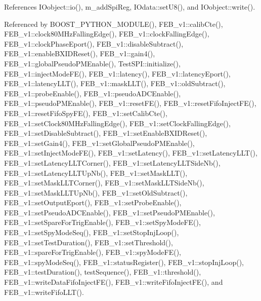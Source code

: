 References I\+Oobject\+::io(), m\+\_\+add\+Spi\+Reg, I\+Odata\+::set\+U8(), and I\+Oobject\+::write().



Referenced by B\+O\+O\+S\+T\+\_\+\+P\+Y\+T\+H\+O\+N\+\_\+\+M\+O\+D\+U\+L\+E(), F\+E\+B\+\_\+v1\+::calib\+Cte(), F\+E\+B\+\_\+v1\+::clock80\+M\+Hz\+Falling\+Edge(), F\+E\+B\+\_\+v1\+::clock\+Falling\+Edge(), F\+E\+B\+\_\+v1\+::clock\+Phase\+Eport(), F\+E\+B\+\_\+v1\+::disable\+Subtract(), F\+E\+B\+\_\+v1\+::enable\+B\+X\+I\+D\+Reset(), F\+E\+B\+\_\+v1\+::gain4(), F\+E\+B\+\_\+v1\+::global\+Pseudo\+P\+M\+Enable(), Test\+S\+P\+I\+::initialize(), F\+E\+B\+\_\+v1\+::inject\+Mode\+F\+E(), F\+E\+B\+\_\+v1\+::latency(), F\+E\+B\+\_\+v1\+::latency\+Eport(), F\+E\+B\+\_\+v1\+::latency\+L\+L\+T(), F\+E\+B\+\_\+v1\+::mask\+L\+L\+T(), F\+E\+B\+\_\+v1\+::old\+Subtract(), F\+E\+B\+\_\+v1\+::probe\+Enable(), F\+E\+B\+\_\+v1\+::pseudo\+A\+D\+C\+Enable(), F\+E\+B\+\_\+v1\+::pseudo\+P\+M\+Enable(), F\+E\+B\+\_\+v1\+::reset\+F\+E(), F\+E\+B\+\_\+v1\+::reset\+Fifo\+Inject\+F\+E(), F\+E\+B\+\_\+v1\+::reset\+Fifo\+Spy\+F\+E(), F\+E\+B\+\_\+v1\+::set\+Calib\+Cte(), F\+E\+B\+\_\+v1\+::set\+Clock80\+M\+Hz\+Falling\+Edge(), F\+E\+B\+\_\+v1\+::set\+Clock\+Falling\+Edge(), F\+E\+B\+\_\+v1\+::set\+Disable\+Subtract(), F\+E\+B\+\_\+v1\+::set\+Enable\+B\+X\+I\+D\+Reset(), F\+E\+B\+\_\+v1\+::set\+Gain4(), F\+E\+B\+\_\+v1\+::set\+Global\+Pseudo\+P\+M\+Enable(), F\+E\+B\+\_\+v1\+::set\+Inject\+Mode\+F\+E(), F\+E\+B\+\_\+v1\+::set\+Latency(), F\+E\+B\+\_\+v1\+::set\+Latency\+L\+L\+T(), F\+E\+B\+\_\+v1\+::set\+Latency\+L\+L\+T\+Corner(), F\+E\+B\+\_\+v1\+::set\+Latency\+L\+L\+T\+Side\+Nb(), F\+E\+B\+\_\+v1\+::set\+Latency\+L\+L\+T\+Up\+Nb(), F\+E\+B\+\_\+v1\+::set\+Mask\+L\+L\+T(), F\+E\+B\+\_\+v1\+::set\+Mask\+L\+L\+T\+Corner(), F\+E\+B\+\_\+v1\+::set\+Mask\+L\+L\+T\+Side\+Nb(), F\+E\+B\+\_\+v1\+::set\+Mask\+L\+L\+T\+Up\+Nb(), F\+E\+B\+\_\+v1\+::set\+Old\+Subtract(), F\+E\+B\+\_\+v1\+::set\+Output\+Eport(), F\+E\+B\+\_\+v1\+::set\+Probe\+Enable(), F\+E\+B\+\_\+v1\+::set\+Pseudo\+A\+D\+C\+Enable(), F\+E\+B\+\_\+v1\+::set\+Pseudo\+P\+M\+Enable(), F\+E\+B\+\_\+v1\+::set\+Spare\+For\+Trig\+Enable(), F\+E\+B\+\_\+v1\+::set\+Spy\+Mode\+F\+E(), F\+E\+B\+\_\+v1\+::set\+Spy\+Mode\+Seq(), F\+E\+B\+\_\+v1\+::set\+Stop\+Inj\+Loop(), F\+E\+B\+\_\+v1\+::set\+Test\+Duration(), F\+E\+B\+\_\+v1\+::set\+Threshold(), F\+E\+B\+\_\+v1\+::spare\+For\+Trig\+Enable(), F\+E\+B\+\_\+v1\+::spy\+Mode\+F\+E(), F\+E\+B\+\_\+v1\+::spy\+Mode\+Seq(), F\+E\+B\+\_\+v1\+::status\+Register(), F\+E\+B\+\_\+v1\+::stop\+Inj\+Loop(), F\+E\+B\+\_\+v1\+::test\+Duration(), test\+Sequence(), F\+E\+B\+\_\+v1\+::threshold(), F\+E\+B\+\_\+v1\+::write\+Data\+Fifo\+Inject\+F\+E(), F\+E\+B\+\_\+v1\+::write\+Fifo\+Inject\+F\+E(), and F\+E\+B\+\_\+v1\+::write\+Fifo\+L\+L\+T().


